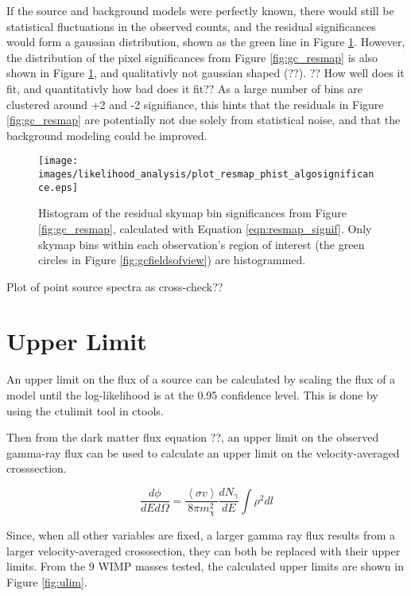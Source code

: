   If the source and background models were perfectly known, there would still be statistical fluctuations in the observed counts, and the residual significances would form a gaussian distribution, shown as the green line in Figure \ref{fig:gc_resmap_sighist}.
  However, the distribution of the pixel significances from Figure \ref{fig:gc_resmap} is also shown in Figure \ref{fig:gc_resmap_sighist}, and qualitativly not gaussian shaped {\color{red}(??)}.
  {\color{red}?? How well does it fit, and quantitativly how bad does it fit??}
  As a large number of bins are clustered around +2 and -2 signifiance, this hints that the residuals in Figure \ref{fig:gc_resmap} are potentially not due solely from statistical noise, and that the background modeling could be improved.
  
  \begin{figure}[ht]
    \centering
    \texttt{[image: images/likelihood\_analysis/plot\_resmap\_phist\_algosignificance.eps]}
    \caption[Galactic Center Residual Histogram]
    {
      Histogram of the residual skymap bin significances from Figure \ref{fig:gc_resmap}, calculated with Equation \ref{eqn:resmap_signif}.
      Only skymap bins within each observation's region of interest (the green circles in Figure \ref{fig:gcfieldsofview}) are histogrammed.
    }
    \label{fig:gc_resmap_sighist}
  \end{figure}

  {\color{red}Plot of point source spectra as cross-check??}
  
\section{Upper Limit}
  An upper limit on the flux of a source can be calculated by scaling the flux of a model until the log-likelihood is at the 0.95 confidence level.
  This is done by using the ctulimit tool in ctools.
  
  Then from the dark matter flux {\color{red}equation ??}, an upper limit on the observed gamma-ray flux can be used to calculate an upper limit on the velocity-averaged crosssection.
  
  \begin{equation}\label{eqn:ulim}
    \frac{d\phi}{dE d\Omega} = \frac{ \left \langle \sigma v \right \rangle }{8\pi m_{\chi}^{2}} \frac{dN_{\gamma}}{dE} \int \rho^{2} dl
  \end{equation}
  
  Since, when all other variables are fixed, a larger gamma ray flux results from a larger velocity-averaged crosssection, they can both be replaced with their upper limits.
  From the 9 WIMP masses tested, the calculated upper limits are shown in Figure \ref{fig:ulim}.

